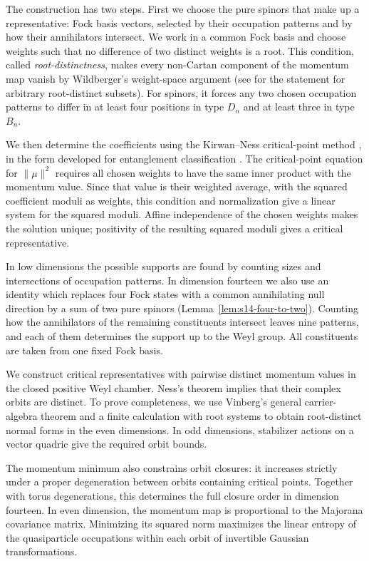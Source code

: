 \documentclass{article}
\theoremstyle{definition}
\theoremstyle{remark}
\newcommand{\norm}[1]{\lVert #1\rVert}
\begin{document}
The construction has two steps. First we choose the pure spinors that
make up a representative: Fock basis vectors, selected by their
occupation patterns and by how their annihilators intersect.
We work in a common Fock basis and choose weights
such that no difference of two distinct weights is a root. This condition,
called \emph{root-distinctness}, makes every non-Cartan component of the
momentum map vanish by Wildberger's weight-space argument
\cite{Wildberger1992TheMM} (see \cite[Lemma~4]{Tsanov2019} for the statement
for arbitrary root-distinct subsets). For spinors, it forces any two chosen occupation patterns to differ in at least four positions in type $D_n$ and at least three in type $B_n$.

We then determine the coefficients using the Kirwan--Ness critical-point
method \cite{Kirwan_cohomology_84,Ness1984}, in the form developed for
entanglement classification
\cite{SOK_criticalset,SOK_convexity,MaciazekSawicki2015}. The critical-point
equation for $\norm\mu^2$ requires all chosen weights to have the same
inner product with the momentum value. Since that value is their weighted
average, with the squared coefficient moduli as weights, this condition
and normalization give a linear system for the squared moduli. Affine
independence of the chosen weights makes the solution unique; positivity
of the resulting squared moduli gives a critical representative.

In low dimensions the possible supports are found by counting sizes and
intersections of occupation patterns. In dimension fourteen we also use
an identity which replaces four Fock states with a common annihilating
null direction by a sum of two pure spinors
(Lemma~\ref{lem:s14-four-to-two}). Counting how the annihilators of the
remaining constituents intersect leaves nine patterns, and each of them
determines the support up to the Weyl group. All constituents are taken
from one fixed Fock basis.

We construct critical representatives with pairwise distinct momentum
values in the closed positive Weyl chamber. Ness's theorem implies that
their complex orbits are distinct. To prove completeness, we use
Vinberg's general carrier-algebra theorem \cite{Vinberg1979} and a
finite calculation with root systems to obtain root-distinct normal forms
in the even dimensions. In odd dimensions, stabilizer actions
on a vector quadric give the required orbit bounds.

The momentum minimum also constrains orbit closures: it increases strictly
under a proper degeneration between orbits containing critical points.
Together with torus degenerations, this determines the full closure
order in dimension fourteen. In even dimension, the momentum map is
proportional to the Majorana covariance matrix. Minimizing its squared norm
maximizes the linear entropy of the quasiparticle occupations within each
orbit of invertible Gaussian transformations.
\end{document}
